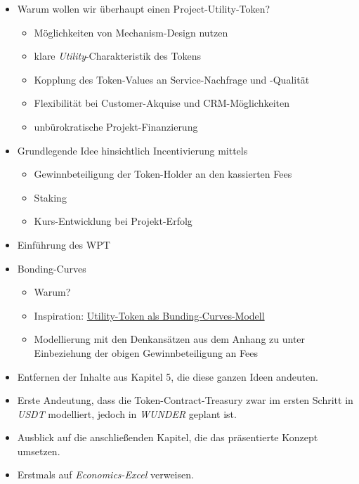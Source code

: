 \begin{itemize}
	\item Warum wollen wir überhaupt einen Project-Utility-Token?
	\begin{itemize}
		\item Möglichkeiten von Mechanism-Design nutzen
		\item klare \textit{Utility}-Charakteristik des Tokens
		\item Kopplung des Token-Values an Service-Nachfrage und -Qualität
		\item Flexibilität bei Customer-Akquise und CRM-Möglichkeiten
		\item unbürokratische Projekt-Finanzierung
	\end{itemize}
	\item Grundlegende Idee hinsichtlich Incentivierung mittels
	\begin{itemize}
		\item Gewinnbeteiligung der Token-Holder an den kassierten Fees
		\item Staking
		\item Kurs-Entwicklung bei Projekt-Erfolg
	\end{itemize}
	\item Einführung des WPT
	\item Bonding-Curves
	\begin{itemize}
		\item Warum?
		\item Inspiration: \href{https://medium.com/atchai/can-we-save-the-utility-token-55ef639370cf}{Utility-Token als Bunding-Curves-Modell}
		\item Modellierung mit den Denkansätzen aus dem Anhang zu  unter Einbeziehung der obigen Gewinnbeteiligung an Fees
	\end{itemize}	
	\item Entfernen der Inhalte aus Kapitel 5, die diese ganzen Ideen andeuten.
	\item Erste Andeutung, dass die Token-Contract-Treasury zwar im ersten Schritt in \textit{USDT} modelliert, jedoch in \textit{WUNDER} geplant ist.
	\item Ausblick auf die anschließenden Kapitel, die das präsentierte Konzept umsetzen.
	\item Erstmals auf \textit{Economics-Excel} verweisen.
\end{itemize}


\vspace{0.5cm}

